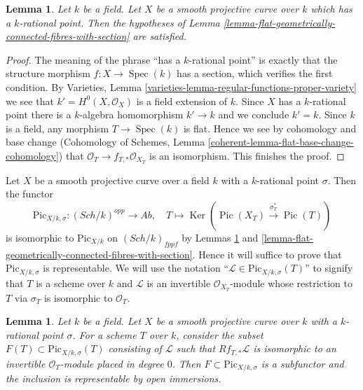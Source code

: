 \documentclass{stacks-project}
\theoremstyle{plain}
\newtheorem{lemma}[subsection]{Lemma}
\theoremstyle{definition}
\theoremstyle{remark}
\numberwithin{equation}{subsection}
\def\Spec{\mathop{\mathrm{Spec}}}
\def\Sch{\mathit{Sch}}
\def\Ker{\mathop{\mathrm{Ker}}}
\def\Pic{\mathop{\mathrm{Pic}}\nolimits}
\def\Picardfunctor{\mathrm{Pic}}
\begin{document}
\begin{lemma}
\label{lemma-check-conditions}
Let $k$ be a field. Let $X$ be a smooth projective curve over $k$
which has a $k$-rational point. Then the hypotheses of
Lemma \ref{lemma-flat-geometrically-connected-fibres-with-section}
are satisfied.
\end{lemma}

\begin{proof}
The meaning of the phrase ``has a $k$-rational point'' is exactly that
the structure morphism $f : X \to \Spec(k)$ has a section, which
verifies the first condition.
By Varieties, Lemma \ref{varieties-lemma-regular-functions-proper-variety}
we see that $k' = H^0(X, \mathcal{O}_X)$ is a field extension of $k$.
Since $X$ has a $k$-rational point there is a $k$-algebra homomorphism
$k' \to k$ and we conclude $k' = k$.
Since $k$ is a field, any morphism $T \to \Spec(k)$ is flat.
Hence we see by cohomology and base change
(Cohomology of Schemes, Lemma \ref{coherent-lemma-flat-base-change-cohomology})
that $\mathcal{O}_T \to f_{T, *}\mathcal{O}_{X_T}$ is an isomorphism.
This finishes the proof.
\end{proof}

\noindent
Let $X$ be a smooth projective curve over a field $k$ with a
$k$-rational point $\sigma$. Then the functor
$$
\Picardfunctor_{X/k, \sigma} : (\Sch/k)^{opp} \longrightarrow \textit{Ab},\quad
T \longmapsto \Ker(\Pic(X_T) \xrightarrow{\sigma_T^*} \Pic(T))
$$
is isomorphic to $\Picardfunctor_{X/k}$ on $(\Sch/k)_{fppf}$
by Lemmas \ref{lemma-check-conditions} and
\ref{lemma-flat-geometrically-connected-fibres-with-section}.
Hence it will suffice to prove that $\Picardfunctor_{X/k, \sigma}$
is representable. We will use the notation
``$\mathcal{L} \in \Picardfunctor_{X/k, \sigma}(T)$'' to signify that
$T$ is a scheme over $k$ and $\mathcal{L}$ is an invertible
$\mathcal{O}_{X_T}$-module whose restriction to $T$ via $\sigma_T$
is isomorphic to $\mathcal{O}_T$.

\begin{lemma}
\label{lemma-define-open}
Let $k$ be a field. Let $X$ be a smooth projective curve over $k$
with a $k$-rational point $\sigma$. For a scheme $T$ over $k$,
consider the subset $F(T) \subset \Picardfunctor_{X/k, \sigma}(T)$ consisting of
$\mathcal{L}$ such that $Rf_{T, *}\mathcal{L}$ is isomorphic to an invertible
$\mathcal{O}_T$-module placed in degree $0$. Then
$F \subset \Picardfunctor_{X/k, \sigma}$ is a subfunctor and the inclusion is
representable by open immersions.
\end{lemma}
\end{document}
